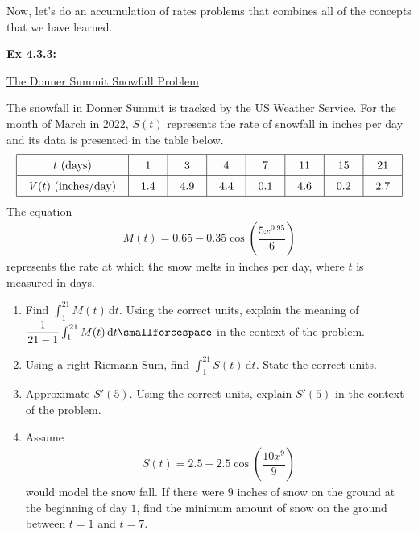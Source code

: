 Now, let's do an accumulation of rates problems that combines all of the concepts that we have learned. \par

\begin{tcolorbox}[example]
    \textbf{Ex 4.3.3: } \begin{center}
        \underline{The Donner Summit Snowfall Problem}
    \end{center} \vspace{11pt}
    The snowfall in Donner Summit is tracked by the US Weather Service. For the month of March in 2022, $S(t)$ represents the rate of snowfall in inches per day and its data is presented in the table below. \begin{align*}
        \arraycolsep=11pt\def\arraystretch{1.5}
        \begin{array}{|c|c|c|c|c|c|c|c|}
            \hline
            t \text{ (days)} & 1 & 3 & 4 & 7 & 11 & 15 & 21 \\ \hline
            V(t) \text{ (inches/day)} & 1.4 & 4.9 & 4.4 & 0.1 & 4.6 & 0.2 & 2.7 \\
            \hline 
        \end{array}
    \end{align*}
    The equation \begin{align*}
        M(t) = 0.65 - 0.35\cos \left(\dfrac{5x^{0.95}}{6}\right)
    \end{align*}
    represents the rate at which the snow melts in inches per day, where $t$ is measured in days. \\
    \begin{enumerate}[label=\hspace{11pt}(\alph*), align=left, leftmargin=*, labelsep=0.25em]
        \item Find $\int_1^{21} M(t) \,\mathrm{d}t$. Using the correct units, explain the meaning of $\dfrac{1}{21 - 1}\int_1^{21} M(t) \,\mathrm{d}t \smallforcespace$ in the context of the problem. \\
        \item Using a right Riemann Sum, find $\int_1^{21} S(t) \,\mathrm{d}t$. State the correct units. \\
        \item Approximate $S'(5)$. Using the correct units, explain $S'(5)$ in the context of the problem. \\
        \item Assume \begin{align*}
            S(t) = 2.5 - 2.5\cos \left(\dfrac{10x^9}{9}\right)
        \end{align*}
        would model the snow fall. If there were $9$ inches of snow on the ground at the beginning of day $1$, find the minimum amount of snow on the ground between $t = 1$ and $t = 7$.
    \end{enumerate} \vspace{11pt}
\end{tcolorbox}
